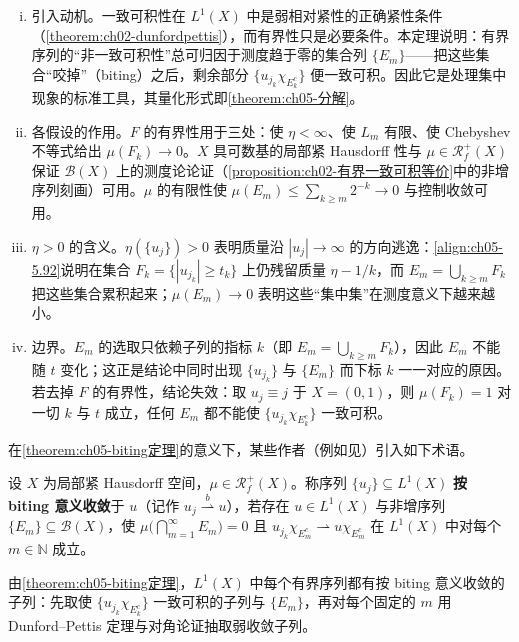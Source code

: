 \documentclass[../../main.tex]{subfiles}
\begin{document}
\begin{remark}\label{remark:ch05-biting引理注}
\begin{enumerate}[(i)]
\item 引入动机。一致可积性在 $L^1(X)$ 中是弱相对紧性的正确紧性条件（\cref{theorem:ch02-dunfordpettis}），而有界性只是必要条件。本定理说明：有界序列的“非一致可积性”总可归因于测度趋于零的集合列 $\{E_m\}$——把这些集合“咬掉”（biting）之后，剩余部分 $\{u_{j_k}\chi_{E_k^c}\}$ 便一致可积。因此它是处理集中现象的标准工具，其量化形式即\cref{theorem:ch05-分解}。

\item 各假设的作用。$F$ 的有界性用于三处：使 $\eta<\infty$、使 $L_m$ 有限、使 Chebyshev 不等式给出 $\mu(F_k)\to0$。$X$ 具可数基的局部紧 Hausdorff 性与 $\mu\in\mathscr{R}^+_f(X)$ 保证 $\mathscr{B}(X)$ 上的测度论论证（\cref{proposition:ch02-有界一致可积等价}中的非增序列刻画）可用。$\mu$ 的有限性使 $\mu(E_m)\leqslant\sum_{k\geqslant m}2^{-k}\to0$ 与控制收敛可用。

\item $\eta>0$ 的含义。$\eta(\{u_j\})>0$ 表明质量沿 $|u_j|\to\infty$ 的方向逃逸：\eqref{align:ch05-5.92}说明在集合 $F_k=\{|u_{j_k}|\geqslant t_k\}$ 上仍残留质量 $\eta-1/k$，而 $E_m=\bigcup_{k\geqslant m}F_k$ 把这些集合累积起来；$\mu(E_m)\to0$ 表明这些“集中集”在测度意义下越来越小。

\item 边界。$E_m$ 的选取只依赖子列的指标 $k$（即 $E_m=\bigcup_{k\geqslant m}F_k$），因此 $E_m$ 不能随 $t$ 变化；这正是结论中同时出现 $\{u_{j_k}\}$ 与 $\{E_m\}$ 而下标 $k$ 一一对应的原因。若去掉 $F$ 的有界性，结论失效：取 $u_j\equiv j$ 于 $X=(0,1)$，则 $\mu(F_k)=1$ 对一切 $k$ 与 $t$ 成立，任何 $E_m$ 都不能使 $\{u_{j_k}\chi_{E_k^c}\}$ 一致可积。
\end{enumerate}
\end{remark}

在\cref{theorem:ch05-biting定理}的意义下，某些作者（例如见\cite[Section 2]{ref53}）引入如下术语。

\begin{remark}\label{remark:ch05-biting意义}
设 $X$ 为局部紧 Hausdorff 空间，$\mu\in\mathscr{R}^+_f(X)$。称序列 $\{u_j\}\subseteq L^1(X)$ \textbf{按 biting 意义收敛}于 $u$（记作 $u_j\stackrel{b}{\rightharpoonup}u$），若存在 $u\in L^1(X)$ 与非增序列 $\{E_m\}\subseteq\mathscr{B}(X)$，使 $\mu\big(\bigcap_{m=1}^\infty E_m\big)=0$ 且 $u_{j_k}\chi_{E_m^c}\rightharpoonup u\chi_{E_m^c}$ 在 $L^1(X)$ 中对每个 $m\in\mathbb{N}$ 成立。

由\cref{theorem:ch05-biting定理}，$L^1(X)$ 中每个有界序列都有按 biting 意义收敛的子列：先取使 $\{u_{j_k}\chi_{E_k^c}\}$ 一致可积的子列与 $\{E_m\}$，再对每个固定的 $m$ 用 Dunford--Pettis 定理与对角论证抽取弱收敛子列。
\end{remark}
\end{document}
